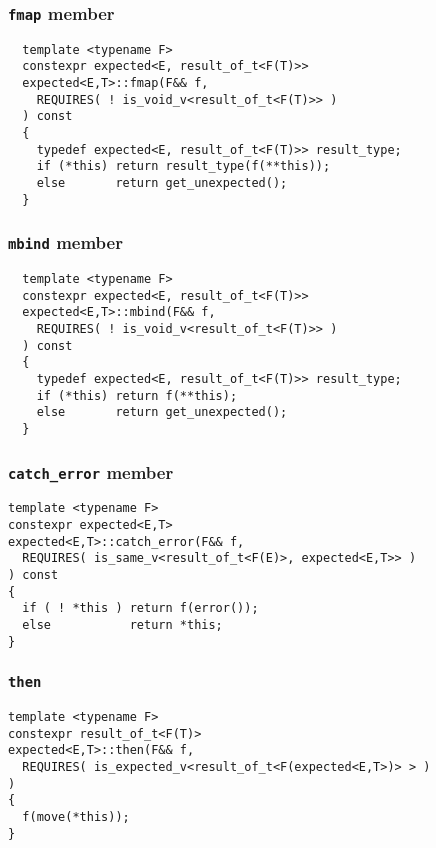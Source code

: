\documentclass[xcolor=dvipsnames]{beamer}
\newcommand{\cpp}[1]{\lstinline{#1}}
\begin{document}
\begin{frame}[fragile]
\frametitle{\cpp{fmap} member}

\begin{lstlisting}
  template <typename F>
  constexpr expected<E, result_of_t<F(T)>>
  expected<E,T>::fmap(F&& f,
    REQUIRES( ! is_void_v<result_of_t<F(T)>> )
  ) const 
  {
    typedef expected<E, result_of_t<F(T)>> result_type;
    if (*this) return result_type(f(**this));
    else       return get_unexpected();
  }
\end{lstlisting}

\end{frame}
\begin{frame}[fragile]
\frametitle{\cpp{mbind} member}

\begin{lstlisting}
  template <typename F>
  constexpr expected<E, result_of_t<F(T)>>
  expected<E,T>::mbind(F&& f,
    REQUIRES( ! is_void_v<result_of_t<F(T)>> )
  ) const 
  {
    typedef expected<E, result_of_t<F(T)>> result_type;
    if (*this) return f(**this);
    else       return get_unexpected();
  }
\end{lstlisting}

\end{frame}
\begin{frame}[fragile]
\frametitle{\cpp{catch_error} member}

\begin{lstlisting}
template <typename F>
constexpr expected<E,T>
expected<E,T>::catch_error(F&& f,
  REQUIRES( is_same_v<result_of_t<F(E)>, expected<E,T>> ) 
) const
{
  if ( ! *this ) return f(error());
  else           return *this;
}
\end{lstlisting}

\end{frame}
\begin{frame}[fragile]
\frametitle{\cpp{then}}

\begin{lstlisting}
template <typename F>
constexpr result_of_t<F(T)>
expected<E,T>::then(F&& f,
  REQUIRES( is_expected_v<result_of_t<F(expected<E,T>)> > ) 
) 
{
  f(move(*this));
}
\end{lstlisting}

\end{frame}
\end{document}

